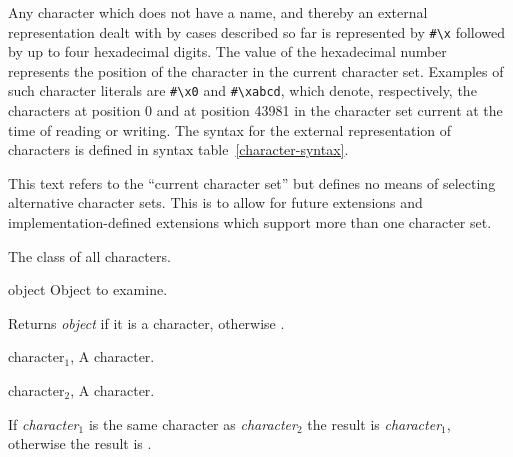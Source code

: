 \begin{optDefinition}
Any character which does not have a name, and thereby an external representation
dealt with by cases described so far is represented by \verb+#\x+ followed by up
to four hexadecimal digits.  The value of the hexadecimal number represents the
position of the character in the current character set.  Examples of such
character literals are \verb+#\x0+ and \verb+#\xabcd+, which denote,
respectively, the characters at position 0 and at position 43981 in the
character set current at the time of reading or writing.  The syntax for the
external representation of characters is defined in
syntax table~\ref{character-syntax}.
%
\begin{note}
    This text refers to the ``current character set'' but defines no means of
    selecting alternative character sets.  This is to allow for future
    extensions and implementation-defined extensions which support more than one
    character set.
\end{note}

%
The class of all characters.

%
\begin{arguments}
    \item[{object}] Object to examine.
\end{arguments}
%
\result%
Returns {\em object\/} if it is a character, otherwise \nil.

%
\begin{specargs}
    \item[character$_1$, \classref{character}] A character.
    \item[character$_2$, \classref{character}] A character.
\end{specargs}
%
\result%
If {\em character$_1$\/} is the same character as {\em character$_2$\/} the
result is {\em character$_1$}, otherwise the result is \nil.


\end{optDefinition}
